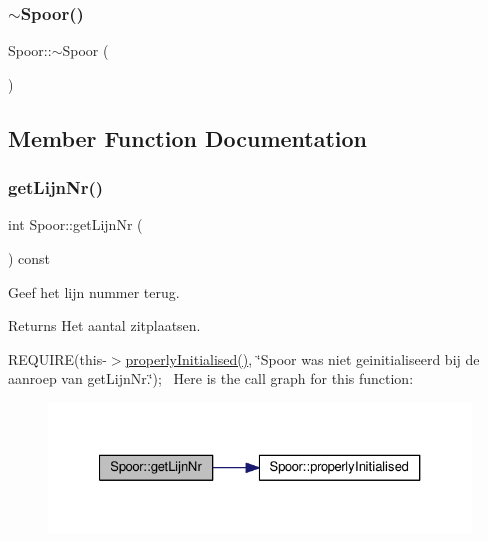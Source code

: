 \subsubsection{\texorpdfstring{$\sim$\+Spoor()}{~Spoor()}}
{\footnotesize\ttfamily Spoor\+::$\sim$\+Spoor (\begin{DoxyParamCaption}{ }\end{DoxyParamCaption})\hspace{0.3cm}{\ttfamily [virtual]}}



\subsection{Member Function Documentation}
\mbox{\label{class_spoor_a66ebc0abcb370b1509bd7b3961a8e45a}} 
\subsubsection{\texorpdfstring{get\+Lijn\+Nr()}{getLijnNr()}}
{\footnotesize\ttfamily int Spoor\+::get\+Lijn\+Nr (\begin{DoxyParamCaption}{ }\end{DoxyParamCaption}) const}



Geef het lijn nummer terug. 

\begin{DoxyReturn}{Returns}
Het aantal zitplaatsen.
\end{DoxyReturn}
R\+E\+Q\+U\+I\+RE(this-\/$>$\hyperlink{class_spoor_a1eb7c54228676cdb7c8620104e063a3c}{properly\+Initialised()}, \char`\"{}\+Spoor was niet geinitialiseerd bij de aanroep van get\+Lijn\+Nr.\char`\"{});~\newline
Here is the call graph for this function\+:\nopagebreak
\begin{figure}[H]
\begin{center}
\leavevmode
\includegraphics[width=327pt]{class_spoor_a66ebc0abcb370b1509bd7b3961a8e45a_cgraph}
\end{center}
\end{figure}
\mbox{\label{class_spoor_a1eb7c54228676cdb7c8620104e063a3c}} 

